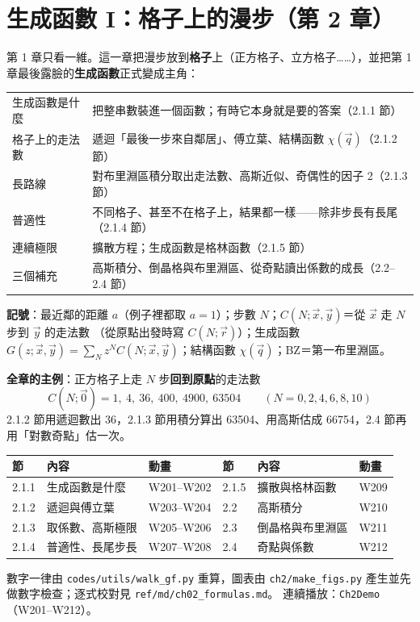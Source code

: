 

\section{生成函數 I：格子上的漫步（第 2 章）}

\begin{keybox}[先看這裡]
第 1 章只看一維。這一章把漫步放到\textbf{格子}上（正方格子、立方格子……），並把第 1 章最後露臉的\textbf{生成函數}正式變成主角：
\begin{center}
\small
\begin{tabular}{@{}ll@{}}
生成函數是什麼 & 把整串數裝進一個函數；有時它本身就是要的答案（2.1.1 節）\\
格子上的走法數 & 遞迴「最後一步來自鄰居」、傅立葉、結構函數 $\chi(\vec q)$（2.1.2 節）\\
長路線 & 對布里淵區積分取出走法數、高斯近似、奇偶性的因子 2（2.1.3 節）\\
普適性 & 不同格子、甚至不在格子上，結果都一樣——除非步長有長尾（2.1.4 節）\\
連續極限 & 擴散方程；生成函數是格林函數（2.1.5 節）\\
三個補充 & 高斯積分、倒晶格與布里淵區、從奇點讀出係數的成長（2.2--2.4 節）
\end{tabular}
\end{center}
\textbf{記號}：最近鄰的距離 $a$（例子裡都取 $a=1$）；步數 $N$；$C(N;\vec x,\vec y)$＝從 $\vec x$ 走 $N$ 步到 $\vec y$ 的走法數
（從原點出發時寫 $C(N;\vec r)$）；生成函數 $G(z;\vec x,\vec y)=\sum_Nz^NC(N;\vec x,\vec y)$；結構函數 $\chi(\vec q)$；BZ＝第一布里淵區。

\textbf{全章的主例}：正方格子上走 $N$ 步\textbf{回到原點}的走法數
\[C(N;\vec0)=1,\ 4,\ 36,\ 400,\ 4900,\ 63504\qquad(N=0,2,4,6,8,10)\]
2.1.2 節用遞迴數出 36，2.1.3 節用積分算出 63504、用高斯估成 66754，2.4 節再用「對數奇點」估一次。
\begin{center}
\small
\begin{tabular}{@{}lll@{\qquad}lll@{}}
\toprule
節 & 內容 & 動畫 & 節 & 內容 & 動畫\\
\midrule
2.1.1 & 生成函數是什麼 & W201--W202 & 2.1.5 & 擴散與格林函數 & W209\\
2.1.2 & 遞迴與傅立葉 & W203--W204 & 2.2 & 高斯積分 & W210\\
2.1.3 & 取係數、高斯極限 & W205--W206 & 2.3 & 倒晶格與布里淵區 & W211\\
2.1.4 & 普適性、長尾步長 & W207--W208 & 2.4 & 奇點與係數 & W212\\
\bottomrule
\end{tabular}
\end{center}
數字一律由 \texttt{codes/utils/walk\_gf.py} 重算，圖表由 \texttt{ch2/make\_figs.py} 產生並先做數字檢查；逐式校對見 \texttt{ref/md/ch02\_formulas.md}。
連續播放：\texttt{Ch2Demo}（W201--W212）。
\end{keybox}

